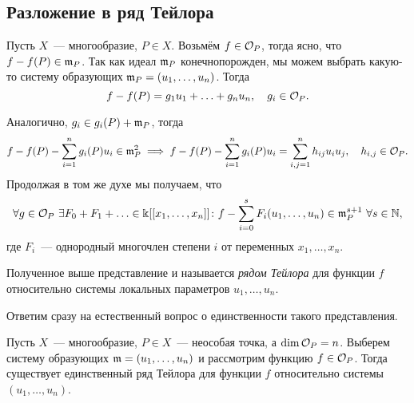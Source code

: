 	\subsection{Разложение в ряд Тейлора}

	Пусть $X$~--- многообразие, $P \in X$. Возьмём $f \in \mathcal{O}_P$, тогда ясно, что $f - f(P) \in \mathfrak{m}_{P}$. Так как идеал $\mathfrak{m}_{P}$ конечнопорожден, мы можем выбрать какую-то систему образующих $\mathfrak{m}_P = (u_1, \ldots, u_n)$. Тогда 
	\[
		f - f(P) = g_1 u_1 + \ldots + g_n u_n, \quad g_i \in \mathcal{O}_P.
	\]

	Аналогично, $g_i \in g_i(P) + \mathfrak{m}_P$, тогда 
	\[
		f - f(P) - \sum_{i = 1}^{n} g_i(P) u_i \in \mathfrak{m}_P^2 \implies f - f(P) - \sum_{i = 1}^{n} g_i(P) u_i = \sum_{i, j = 1}^{n} h_{i j} u_i u_j, \quad h_{i, j} \in \mathcal{O}_P.
	\]
	Продолжая в том же духе мы получаем, что 
	\[
		\forall g \in \mathcal{O}_P \ \exists F_0 + F_1 + \ldots \in \Bbbk[[x_1, \ldots, x_n]]\colon f - \sum_{i = 0}^{s} F_i(u_1, \ldots, u_n) \in \mathfrak{m}_P^{s + 1} \ \forall s \in \mathbb{N},
	\]
	где $F_i$~--- однородный многочлен степени $i$ от переменных $x_1, \ldots, x_n$. 

	\begin{definition} 
		Полученное выше представление и называется \emph{рядом Тейлора} для функции $f$ относительно системы локальных параметров $u_1, \ldots, u_n$. 
	\end{definition}

	Ответим сразу на естественный вопрос о единственности такого представления. 

	\begin{theorem} 
		Пусть $X$~--- многообразие, $P \in X$~--- неособая точка, а $\dim{\mathcal{O}_{P}} = n$. Выберем систему образующих $\mathfrak{m} = (u_1, \ldots, u_n)$ и рассмотрим функцию $f \in \mathcal{O}_P$. Тогда существует единственный ряд Тейлора для функции $f$ относительно системы $(u_1, \ldots, u_n)$.
	\end{theorem}

